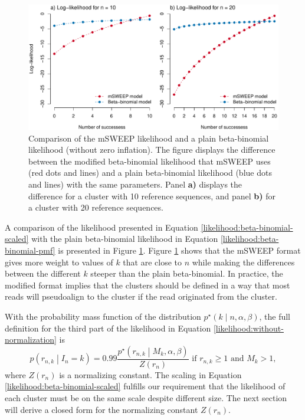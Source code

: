 \documentclass[officiallayout]{tktla}
\let\svthefootnote\thefootnote
\begin{document}
\addtocounter{footnote}{-1}\let\thefootnote\svthefootnote
\begin{figure}[!h]
  \label{fig:msweep-vs-beta-binomial}
    \centering
    \includegraphics[width=\textwidth,keepaspectratio]{img/mSWEEP_likelihood.pdf}
    \caption{Comparison of the mSWEEP likelihood and a plain beta-binomial likelihood (without zero inflation). The figure displays the difference between the modified beta-binomial likelihood that mSWEEP uses (red dots and lines) and a plain beta-binomial likelihood (blue dots and lines) with the same parameters. Panel \textbf{a)} displays the difference for a cluster with 10 reference sequences, and panel \textbf{b)} for a cluster with 20 reference sequences.}
\end{figure}

A comparison of the likelihood presented in Equation
\ref{likelihood:beta-binomial-scaled} with the plain beta-binomial
likelihood in Equation \ref{likelihood:beta-binomial-pmf} is presented
in Figure \ref{fig:msweep-vs-beta-binomial}. Figure
\ref{fig:msweep-vs-beta-binomial} shows that the mSWEEP format gives
more weight to values of $k$ that are close to $n$ while making the
differences between the different $k$ steeper than the plain
beta-binomial. In practice, the modified format implies that the
clusters should be defined in a way that most reads will pseudoalign
to the cluster if the read originated from the cluster.

With the probability mass function of the distribution
$p^{\star}\left(k \middle| n, \alpha, \beta\right)$, the full
definition for the third part of the likelihood in Equation \ref{likelihood:without-normalization} is
\begin{equation}
  \label{likelihood:normalized}
  p\left(r_{n, k} \middle| I_{n} = k\right) = 0.99\frac{p^{\star}\left(r_{n, k} \middle| M_{k}, \alpha, \beta\right)}{Z\left(r_{n}\right)}\text{ if } r_{n, k} \geq 1\text{ and } M_{k} > 1,
\end{equation}
where $Z\left(r_{n}\right)$ is a normalizing constant. The
scaling in Equation \ref{likelihood:beta-binomial-scaled} fulfills our
requirement that the likelihood of each cluster must be on the same
scale despite different size. The next section will derive a closed
form for the normalizing constant $Z\left(r_{n}\right)$.
\end{document}
